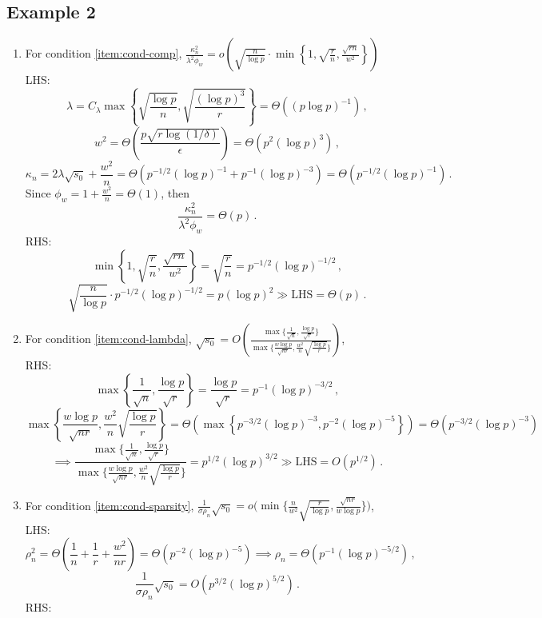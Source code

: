 \documentclass[11pt]{article}
\begin{document}
\subsection{Example 2}
\begin{enumerate}
\item For condition \ref{item:cond-comp}, $\frac{\kappa_n^2}{\lambda^2\phi_w}=o\left(\sqrt{\frac{n}{\log p}}\cdot\min\left\{1,\sqrt{\frac{r}{n}},\frac{\sqrt{rn}}{w^2}\right\}\right)$\\
LHS:
\[
\lambda = C_\lambda\max\left\{\sqrt{\frac{\log p}{n}},\sqrt{\frac{(\log p)^3}{r}}\right\}=\Theta\left((p\log p)^{-1}\right)\,,
\]
\[
w^2=\Theta\left(\frac{p\sqrt{r\log (1/\delta)}}{\epsilon}\right)=\Theta\left(p^2(\log p)^3\right)\,,
\]
\[
\kappa_n =2\lambda\sqrt{s_0}+\frac{w^2}{n}=\Theta\left(p^{-1/2}(\log p)^{-1}+p^{-1}(\log p)^{-3}\right)=\Theta\left(p^{-1/2}(\log p)^{-1}\right)\,.
\]
Since $\phi_w = 1+\frac{w^2}{n}=\Theta(1)$, then 
\[
\frac{\kappa_n^2}{\lambda^2\phi_w}=\Theta(p)\,.
\]
RHS:
\[
\min\left\{1,\sqrt{\frac{r}{n}},\frac{\sqrt{rn}}{w^2}\right\}=\sqrt{\frac{r}{n}}=p^{-1/2}(\log p)^{-1/2}\,,
\]
\[
\sqrt{\frac{n}{\log p}}\cdot p^{-1/2}(\log p)^{-1/2}=p
(\log p)^2\gg \mbox{LHS}=\Theta(p)\,.
\]
\item For condition \ref{item:cond-lambda}, $\sqrt{s_0} = O\left(\frac{\max\big\{\frac{1}{\sqrt{n}},\frac{\log p }{\sqrt{r}}\big\}}{\max\big\{\frac{w\log p}{\sqrt{nr}},\frac{w^2}{n}\sqrt{\frac{\log p}{r}}\big\}}\right)$,\\
RHS:
\[
\max\left\{\frac{1}{\sqrt{n}},\frac{\log p}{\sqrt{r}}\right\}=\frac{\log p}{\sqrt{r}} = p^{-1}(\log p)^{-3/2}\,,
\]
\[
\max\left\{\frac{w\log p}{\sqrt{nr}},\frac{w^2}{n}\sqrt{\frac{\log p}{r}}\right\}=\Theta\left(\max\left\{p^{-3/2}(\log p)^{-3},p^{-2}(\log p)^{-5} \right\}\right)=\Theta\left(p^{-3/2}(\log p)^{-3}\right)
\]
\[
\implies\frac{\max\big\{\frac{1}{\sqrt{n}},\frac{\log p }{\sqrt{r}}\big\}}{\max\big\{\frac{w\log p}{\sqrt{nr}},\frac{w^2}{n}\sqrt{\frac{\log p}{r}}\big\}}=p^{1/2}(\log p)^{3/2}\gg\mbox{LHS}= O(p^{1/2})\,.
\]
\item For condition \ref{item:cond-sparsity}, $\frac{1}{\sigma\rho_n}\sqrt{s_0} = o\bigg(\min \bigg\{\frac{n}{w^2}\sqrt{\frac{r}{\log p}},\frac{\sqrt{nr}}{w\log p}\bigg\}\bigg)$,\\
LHS:
\[
\rho_n^2 = \Theta\left(\frac{1}{n}+\frac{1}{r}+\frac{w^2}{nr}\right)=\Theta\left(p^{-2}(\log p)^{-5}\right)\implies \rho_n=\Theta\left( p^{-1}(\log p)^{-5/2}\right)\,,
\]
\[
\frac{1}{\sigma\rho_n}\sqrt{s_0} =O\left( p^{3/2}(\log p)^{5/2}\right)\,.
\]
RHS:

\end{enumerate}
\end{document}
